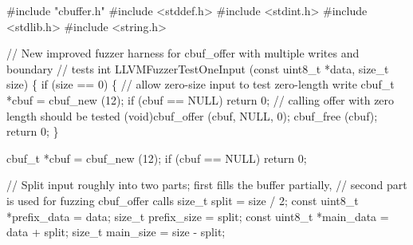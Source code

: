 \documentclass[
  a4paper,
]{scrreprt}
\newenvironment{Shaded}{\begin{snugshade}}{\end{snugshade}}
\newcommand{\CommentTok}[1]{\textcolor[rgb]{0.41,0.41,0.41}{#1}}
\newcommand{\ControlFlowTok}[1]{\textcolor[rgb]{0.85,0.12,0.09}{#1}}
\newcommand{\DataTypeTok}[1]{\textcolor[rgb]{0.47,0.16,0.63}{#1}}
\newcommand{\DecValTok}[1]{\textcolor[rgb]{0.47,0.16,0.63}{#1}}
\newcommand{\ImportTok}[1]{\textcolor[rgb]{0.33,0.33,0.33}{#1}}
\newcommand{\NormalTok}[1]{\textcolor[rgb]{0.33,0.33,0.33}{#1}}
\newcommand{\OperatorTok}[1]{\textcolor[rgb]{0.00,0.46,0.62}{#1}}
\newcommand{\PreprocessorTok}[1]{\textcolor[rgb]{0.47,0.16,0.63}{#1}}
\theoremstyle{definition}
\theoremstyle{remark}
\begin{document}
\begin{Shaded}
\begin{Highlighting}[numbers=left,,]
\PreprocessorTok{\#include }\ImportTok{"cbuffer.h"}
\PreprocessorTok{\#include }\ImportTok{\textless{}stddef.h\textgreater{}}
\PreprocessorTok{\#include }\ImportTok{\textless{}stdint.h\textgreater{}}
\PreprocessorTok{\#include }\ImportTok{\textless{}stdlib.h\textgreater{}}
\PreprocessorTok{\#include }\ImportTok{\textless{}string.h\textgreater{}}

\CommentTok{// New improved fuzzer harness for cbuf\_offer with multiple writes and boundary}
\CommentTok{// tests}
\DataTypeTok{int}
\NormalTok{LLVMFuzzerTestOneInput }\OperatorTok{(}\DataTypeTok{const} \DataTypeTok{uint8\_t} \OperatorTok{*}\NormalTok{data}\OperatorTok{,} \DataTypeTok{size\_t}\NormalTok{ size}\OperatorTok{)}
\OperatorTok{\{}
  \ControlFlowTok{if} \OperatorTok{(}\NormalTok{size }\OperatorTok{==} \DecValTok{0}\OperatorTok{)}
    \OperatorTok{\{}
      \CommentTok{// allow zero{-}size input to test zero{-}length write}
\NormalTok{      cbuf\_t }\OperatorTok{*}\NormalTok{cbuf }\OperatorTok{=}\NormalTok{ cbuf\_new }\OperatorTok{(}\DecValTok{12}\OperatorTok{);}
      \ControlFlowTok{if} \OperatorTok{(}\NormalTok{cbuf }\OperatorTok{==}\NormalTok{ NULL}\OperatorTok{)}
        \ControlFlowTok{return} \DecValTok{0}\OperatorTok{;}
      \CommentTok{// calling offer with zero length should be tested}
      \OperatorTok{(}\DataTypeTok{void}\OperatorTok{)}\NormalTok{cbuf\_offer }\OperatorTok{(}\NormalTok{cbuf}\OperatorTok{,}\NormalTok{ NULL}\OperatorTok{,} \DecValTok{0}\OperatorTok{);}
\NormalTok{      cbuf\_free }\OperatorTok{(}\NormalTok{cbuf}\OperatorTok{);}
      \ControlFlowTok{return} \DecValTok{0}\OperatorTok{;}
    \OperatorTok{\}}

\NormalTok{  cbuf\_t }\OperatorTok{*}\NormalTok{cbuf }\OperatorTok{=}\NormalTok{ cbuf\_new }\OperatorTok{(}\DecValTok{12}\OperatorTok{);}
  \ControlFlowTok{if} \OperatorTok{(}\NormalTok{cbuf }\OperatorTok{==}\NormalTok{ NULL}\OperatorTok{)}
    \ControlFlowTok{return} \DecValTok{0}\OperatorTok{;}

  \CommentTok{// Split input roughly into two parts; first fills the buffer partially,}
  \CommentTok{// second part is used for fuzzing cbuf\_offer calls}
  \DataTypeTok{size\_t}\NormalTok{ split }\OperatorTok{=}\NormalTok{ size }\OperatorTok{/} \DecValTok{2}\OperatorTok{;}
  \DataTypeTok{const} \DataTypeTok{uint8\_t} \OperatorTok{*}\NormalTok{prefix\_data }\OperatorTok{=}\NormalTok{ data}\OperatorTok{;}
  \DataTypeTok{size\_t}\NormalTok{ prefix\_size }\OperatorTok{=}\NormalTok{ split}\OperatorTok{;}
  \DataTypeTok{const} \DataTypeTok{uint8\_t} \OperatorTok{*}\NormalTok{main\_data }\OperatorTok{=}\NormalTok{ data }\OperatorTok{+}\NormalTok{ split}\OperatorTok{;}
  \DataTypeTok{size\_t}\NormalTok{ main\_size }\OperatorTok{=}\NormalTok{ size }\OperatorTok{{-}}\NormalTok{ split}\OperatorTok{;}


\end{Highlighting}
\end{Shaded}
\end{document}
